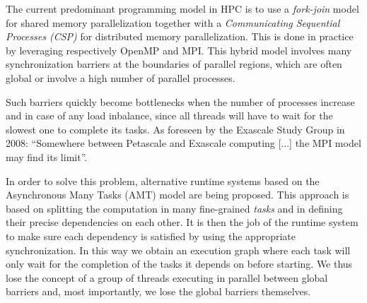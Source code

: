 The current predominant programming model in HPC is to use a \emph{fork-join} model for shared memory parallelization together with a \emph{Communicating Sequential Processes (CSP)}\cite{hoare1978communicating} for distributed memory parallelization. This is done in practice by leveraging respectively OpenMP and MPI.
This hybrid model involves many synchronization barriers at the boundaries of parallel regions, which are often global or involve a high number of parallel processes.

Such barriers quickly become bottlenecks when the number of processes increase and in case of any load inbalance, since all threads will have to wait for the slowest one to complete its tasks. As foreseen by the Exascale Study Group in 2008: ``Somewhere between Petascale and Exascale computing [...] the MPI model may find its limit''.\cite{bergman2008exascale}

In order to solve this problem, alternative runtime systems based on the Asynchronous Many Tasks (AMT) model are being proposed\cite{heller2017hpx}. This approach is based on splitting the computation in many fine-grained \emph{tasks} and in defining their precise dependencies on each other.
It is then the job of the runtime system to make sure each dependency is satisfied by using the appropriate synchronization.
In this way we obtain an execution graph where each task will only wait for the completion of the tasks it depends on before starting. We thus lose the concept of 
a group of threads executing in parallel between global barriers
and, most importantly, we lose the global barriers themselves.

